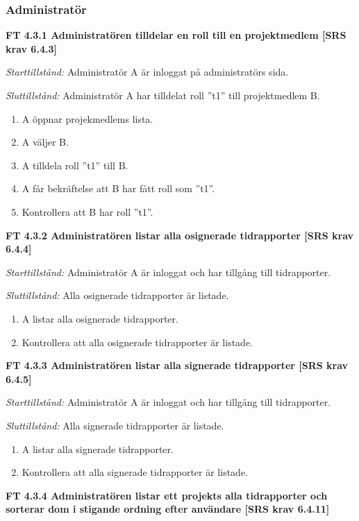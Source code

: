 \documentclass[a4paper]{article}
\begin{document}
\subsubsection{Administratör}

\textbf{FT 4.3.1 Administratören tilldelar en roll till en projektmedlem [SRS krav 6.4.3]}

\emph{Starttillstånd:} Administratör A är inloggat på administratörs sida.

\emph{Sluttillstånd:} Administratör A har tilldelat roll ”t1” till projektmedlem B.

\begin{enumerate}
\item A öppnar projekmedlems lista.
\item A väljer B.
\item A tilldela roll ”t1” till B.
\item A får bekräftelse att B har fått roll som ”t1”.
\item Kontrollera att B har roll ”t1”.
\end{enumerate}

\textbf{FT 4.3.2 Administratören listar alla osignerade tidrapporter [SRS krav 6.4.4]}

\emph{Starttillstånd:} Administratör A är inloggat och har tillgång till tidrapporter.

\emph{Sluttillstånd:} Alla osignerade tidrapporter är listade.

\begin{enumerate}
\item A listar alla osignerade tidrapporter.
\item Kontrollera att alla osignerade tidrapporter är listade.
\end{enumerate}

\textbf{FT 4.3.3 Administratören listar alla signerade tidrapporter [SRS krav 6.4.5]}

\emph{Starttillstånd:}  Administratör A är inloggat och har tillgång till tidrapporter.

\emph{Sluttillstånd:} Alla signerade tidrapporter är listade.

\begin{enumerate}
\item A listar alla signerade tidrapporter.
\item Kontrollera att alla signerade tidrapporter är listade.
\end{enumerate}

\textbf{FT 4.3.4 Administratören listar ett projekts alla tidrapporter och sorterar dom i stigande ordning efter användare [SRS krav 6.4.11]}
\end{document}
